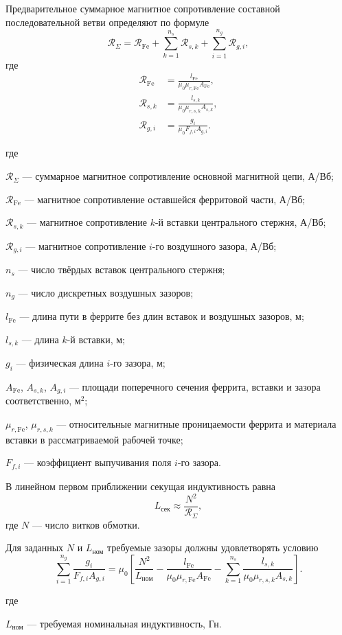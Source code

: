 \documentclass[14pt,a4paper]{extarticle}
\newenvironment{whereblock}
 {\par\noindent где\par
  \begin{list}{}{\setlength{\leftmargin}{12.5mm}
                  \setlength{\itemindent}{-12.5mm}
                  \setlength{\itemsep}{0pt}
                  \setlength{\parsep}{0pt}
                  \setlength{\topsep}{0pt}}}
 {\end{list}}
\newcommand{\whereitem}[2]{\item[] #1 --- #2}
\begin{document}
Предварительное суммарное магнитное сопротивление составной последовательной
ветви определяют по формуле
\begin{equation}
 \mathcal R_{\Sigma}=
 \mathcal R_{\text{Fe}}+
 \sum_{k=1}^{n_s}\mathcal R_{s,k}+
 \sum_{i=1}^{n_g}\mathcal R_{g,i},
 \label{eq:hybrid-reluctance-total}
\end{equation}
где
\begin{align}
 \mathcal R_{\text{Fe}}&=
 \frac{l_{\text{Fe}}}
 {\mu_0\mu_{r,\text{Fe}}A_{\text{Fe}}},
 \label{eq:hybrid-reluctance-ferrite}\\
 \mathcal R_{s,k}&=
 \frac{l_{s,k}}
 {\mu_0\mu_{r,s,k}A_{s,k}},
 \label{eq:hybrid-reluctance-segment}\\
 \mathcal R_{g,i}&=
 \frac{g_i}
 {\mu_0F_{f,i}A_{g,i}}.
 \label{eq:hybrid-reluctance-gap}
\end{align}
\begin{whereblock}
\whereitem{$\mathcal R_{\Sigma}$}{суммарное магнитное сопротивление основной
магнитной цепи, А/Вб;}
\whereitem{$\mathcal R_{\text{Fe}}$}{магнитное сопротивление оставшейся
ферритовой части, А/Вб;}
\whereitem{$\mathcal R_{s,k}$}{магнитное сопротивление $k$-й вставки
центрального стержня, А/Вб;}
\whereitem{$\mathcal R_{g,i}$}{магнитное сопротивление $i$-го воздушного
зазора, А/Вб;}
\whereitem{$n_s$}{число твёрдых вставок центрального стержня;}
\whereitem{$n_g$}{число дискретных воздушных зазоров;}
\whereitem{$l_{\text{Fe}}$}{длина пути в феррите без длин вставок и
воздушных зазоров, м;}
\whereitem{$l_{s,k}$}{длина $k$-й вставки, м;}
\whereitem{$g_i$}{физическая длина $i$-го зазора, м;}
\whereitem{$A_{\text{Fe}}$, $A_{s,k}$, $A_{g,i}$}{площади поперечного
сечения феррита, вставки и зазора соответственно, м$^2$;}
\whereitem{$\mu_{r,\text{Fe}}$, $\mu_{r,s,k}$}{относительные магнитные
проницаемости феррита и материала вставки в рассматриваемой рабочей точке;}
\whereitem{$F_{f,i}$}{коэффициент выпучивания поля $i$-го зазора.}
\end{whereblock}

В линейном первом приближении секущая индуктивность равна
\begin{equation}
 L_{\text{сек}}\approx
 \frac{N^2}{\mathcal R_{\Sigma}},
 \label{eq:hybrid-inductance}
\end{equation}
где $N$ --- число витков обмотки.

Для заданных $N$ и $L_{\text{ном}}$ требуемые зазоры должны удовлетворять
условию
\begin{equation}
 \sum_{i=1}^{n_g}\frac{g_i}{F_{f,i}A_{g,i}}=
 \mu_0\left[
 \frac{N^2}{L_{\text{ном}}}
 -\frac{l_{\text{Fe}}}{\mu_0\mu_{r,\text{Fe}}A_{\text{Fe}}}
 -\sum_{k=1}^{n_s}
 \frac{l_{s,k}}{\mu_0\mu_{r,s,k}A_{s,k}}
 \right].
 \label{eq:hybrid-gap-balance}
\end{equation}
\begin{whereblock}
\whereitem{$L_{\text{ном}}$}{требуемая номинальная индуктивность, Гн.}
\end{whereblock}
\end{document}
